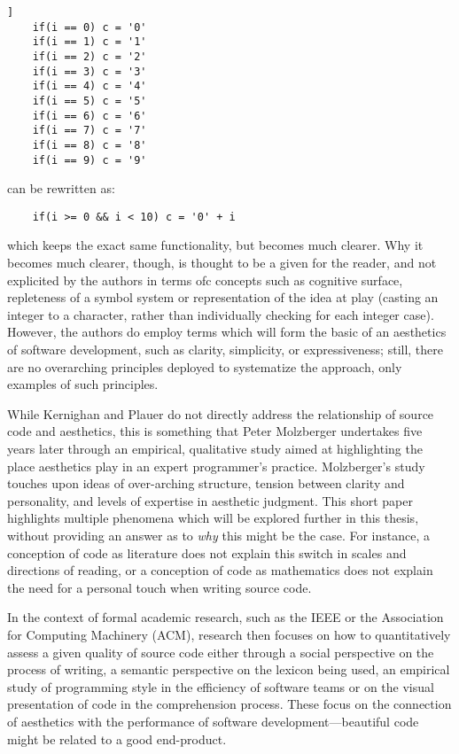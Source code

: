 \begin{lstlisting}]
    if(i == 0) c = '0'
    if(i == 1) c = '1'
    if(i == 2) c = '2'
    if(i == 3) c = '3'
    if(i == 4) c = '4'
    if(i == 5) c = '5'
    if(i == 6) c = '6'
    if(i == 7) c = '7'
    if(i == 8) c = '8'
    if(i == 9) c = '9'
\end{lstlisting}

can be rewritten as:

\begin{lstlisting}
    if(i >= 0 && i < 10) c = '0' + i
\end{lstlisting}

which keeps the exact same functionality, but becomes much clearer. Why it becomes much clearer, though, is thought to be a given for the reader, and not explicited by the authors in terms ofc concepts such as cognitive surface, repleteness of a symbol system or representation of the idea at play (casting an integer to a character, rather than individually checking for each integer case). However, the authors do employ terms which will form the basic of an aesthetics of software development, such as clarity, simplicity, or expressiveness; still, there are no overarching principles deployed to systematize the approach, only examples of such principles.

While Kernighan and Plauer do not directly address the relationship of source code and aesthetics, this is something that Peter Molzberger undertakes five years later through an empirical, qualitative study aimed at highlighting the place aesthetics play in an expert programmer's practice\cite{molzberger_aesthetics_1983}. Molzberger's study touches upon ideas of over-arching structure, tension between clarity and personality, and levels of expertise in aesthetic judgment. This short paper highlights multiple phenomena which will be explored further in this thesis, without providing an answer as to \emph{why} this might be the case. For instance, a conception of code as literature does not explain this switch in scales and directions of reading, or a conception of code as mathematics does not explain the need for a personal touch when writing source code\cite{molzberger_aesthetics_1983}.

In the context of formal academic research, such as the IEEE or the Association for Computing Machinery (ACM), research then focuses on how to quantitatively assess a given quality of source code either through a social perspective on the process of writing\cite{norick_effects_2010}, a semantic perspective on the lexicon being used\cite{fakhoury_improving_2019,guerrouj_normalizing_2013}, an empirical study of programming style in the efficiency of software teams\cite{reed_sometimes_2010} or on the visual presentation of code in the comprehension process\cite{marcus_graphic_1982}. These focus on the connection of aesthetics with the performance of software development—beautiful code might be related to a good end-product.

